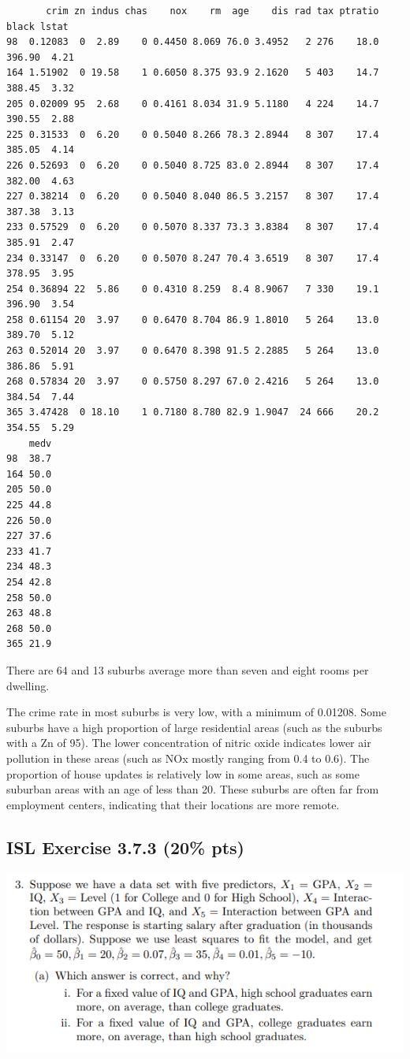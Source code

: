 \documentclass[
]{article}
\begin{document}
\begin{verbatim}
       crim zn indus chas    nox    rm  age    dis rad tax ptratio  black lstat
98  0.12083  0  2.89    0 0.4450 8.069 76.0 3.4952   2 276    18.0 396.90  4.21
164 1.51902  0 19.58    1 0.6050 8.375 93.9 2.1620   5 403    14.7 388.45  3.32
205 0.02009 95  2.68    0 0.4161 8.034 31.9 5.1180   4 224    14.7 390.55  2.88
225 0.31533  0  6.20    0 0.5040 8.266 78.3 2.8944   8 307    17.4 385.05  4.14
226 0.52693  0  6.20    0 0.5040 8.725 83.0 2.8944   8 307    17.4 382.00  4.63
227 0.38214  0  6.20    0 0.5040 8.040 86.5 3.2157   8 307    17.4 387.38  3.13
233 0.57529  0  6.20    0 0.5070 8.337 73.3 3.8384   8 307    17.4 385.91  2.47
234 0.33147  0  6.20    0 0.5070 8.247 70.4 3.6519   8 307    17.4 378.95  3.95
254 0.36894 22  5.86    0 0.4310 8.259  8.4 8.9067   7 330    19.1 396.90  3.54
258 0.61154 20  3.97    0 0.6470 8.704 86.9 1.8010   5 264    13.0 389.70  5.12
263 0.52014 20  3.97    0 0.6470 8.398 91.5 2.2885   5 264    13.0 386.86  5.91
268 0.57834 20  3.97    0 0.5750 8.297 67.0 2.4216   5 264    13.0 384.54  7.44
365 3.47428  0 18.10    1 0.7180 8.780 82.9 1.9047  24 666    20.2 354.55  5.29
    medv
98  38.7
164 50.0
205 50.0
225 44.8
226 50.0
227 37.6
233 41.7
234 48.3
254 42.8
258 50.0
263 48.8
268 50.0
365 21.9
\end{verbatim}

There are 64 and 13 suburbs average more than seven and eight rooms per
dwelling.

The crime rate in most suburbs is very low, with a minimum of 0.01208.
Some suburbs have a high proportion of large residential areas (such as
the suburbs with a Zn of 95). The lower concentration of nitric oxide
indicates lower air pollution in these areas (such as NOx mostly ranging
from 0.4 to 0.6). The proportion of house updates is relatively low in
some areas, such as some suburban areas with an age of less than 20.
These suburbs are often far from employment centers, indicating that
their locations are more remote.

\hypertarget{isl-exercise-3.7.3-20-pts}{%
\subsection{ISL Exercise 3.7.3 (20\%
pts)}\label{isl-exercise-3.7.3-20-pts}}

\includegraphics{images/clipboard-2573688108.png}
\end{document}
